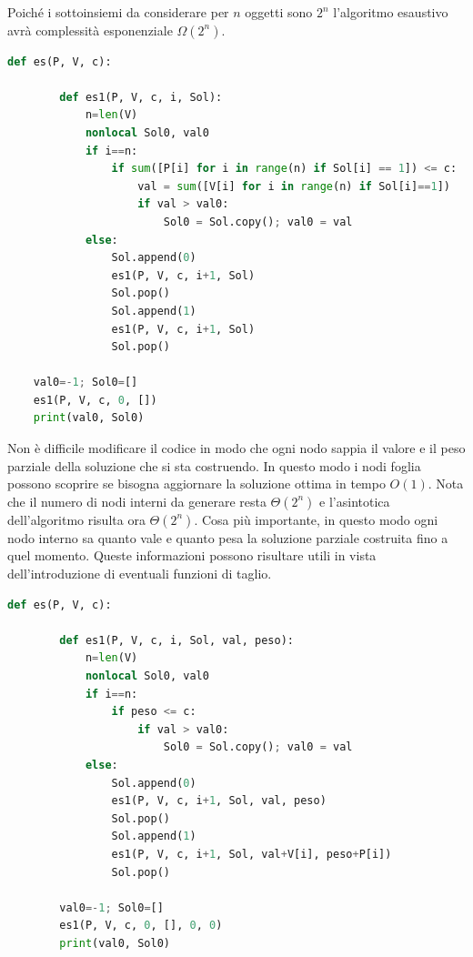 Poiché i sottoinsiemi da considerare per $n$ oggetti sono $2^n$ l'algoritmo esaustivo avrà complessità esponenziale $\Omega(2^n)$.

\begin{lstlisting}[language=Python]
    def es(P, V, c):
        
        def es1(P, V, c, i, Sol):
            n=len(V)
            nonlocal Sol0, val0
            if i==n:
                if sum([P[i] for i in range(n) if Sol[i] == 1]) <= c:
                    val = sum([V[i] for i in range(n) if Sol[i]==1])
                    if val > val0:
                        Sol0 = Sol.copy(); val0 = val
            else:
                Sol.append(0)
                es1(P, V, c, i+1, Sol)
                Sol.pop()
                Sol.append(1)
                es1(P, V, c, i+1, Sol)
                Sol.pop()
    
    val0=-1; Sol0=[]
    es1(P, V, c, 0, [])
    print(val0, Sol0)
\end{lstlisting}

Non è difficile modificare il codice in modo che ogni nodo sappia il valore e il peso parziale della soluzione che si sta costruendo. In questo modo i nodi foglia possono scoprire se bisogna aggiornare la soluzione ottima in tempo $O(1)$. Nota che il numero di nodi interni da generare resta $\Theta(2^n)$ e l’asintotica dell’algoritmo risulta ora $\Theta(2^n)$. Cosa più importante, in questo modo ogni nodo interno sa quanto vale e quanto pesa la soluzione parziale costruita fino a quel momento. Queste informazioni possono risultare utili in vista dell’introduzione di eventuali funzioni di taglio.

\begin{lstlisting}[language=Python]
    def es(P, V, c):
        
        def es1(P, V, c, i, Sol, val, peso):
            n=len(V)
            nonlocal Sol0, val0
            if i==n:
                if peso <= c:
                    if val > val0:
                        Sol0 = Sol.copy(); val0 = val
            else:
                Sol.append(0)
                es1(P, V, c, i+1, Sol, val, peso)
                Sol.pop() 
                Sol.append(1)
                es1(P, V, c, i+1, Sol, val+V[i], peso+P[i])
                Sol.pop()

        val0=-1; Sol0=[]
        es1(P, V, c, 0, [], 0, 0)
        print(val0, Sol0)
\end{lstlisting}

